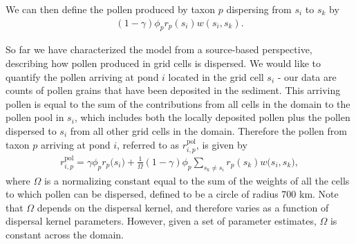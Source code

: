 \documentclass[12pt]{article}
\begin{document}
 
We can then define the pollen produced by taxon $p$ dispersing from
$s_i$ to $s_k$ by
\begin{align}
(1-\gamma) \phi_p r_p(s_i) w(s_i, s_k).
\end{align}




So far we have characterized the model from a source-based
perspective, describing how pollen produced in grid cells is
dispersed. We would like to quantify the pollen arriving at pond $i$
located in the grid cell $s_i$ - our data are counts of pollen grains
that have been deposited in the sediment. This arriving pollen is
equal to the sum of the contributions from all cells in the domain to
the pollen pool in $s_i$, which includes both the locally deposited
pollen plus the pollen dispersed to $s_i$ from all other grid cells
in the domain. Therefore the pollen from taxon $p$ arriving at pond
$i$, referred to as $r_{i,p}^{\text{pol}}$, is given by
\begin{align}
r_{i,p}^{\text{pol}} = \gamma \phi_p r_p\bigl(s_i\bigr) + \frac{1}{\Omega} (1-\gamma) \phi_p \sum_{s_k \neq s_i } r_p(s_k) w\bigl(s_i, s_k\bigr),
\label{eq:arriving}
\end{align}
where $\Omega$ is a normalizing constant equal to the sum of the
weights of all the cells to which pollen can be dispersed, defined to
be a circle of radius 700 km. Note that $\Omega$ depends on the
dispersal kernel, and therefore varies as a function of dispersal
kernel parameters. However, given a set of parameter estimates,
$\Omega$ is constant across the domain.
\end{document}
